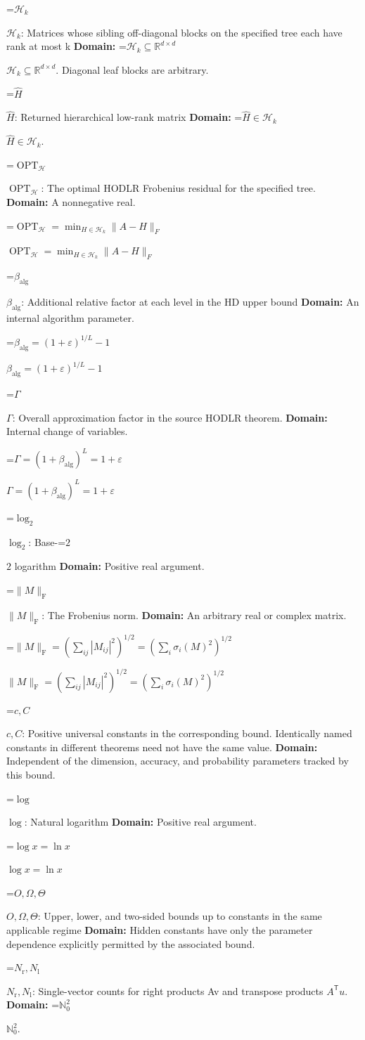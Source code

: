 \documentclass[10pt,a4paper]{article}
\newcommand{\AtlasMath}[1]{\par\begingroup\centering\setbox0=\hbox{$\displaystyle #1$}\ifdim\wd0>1.4\linewidth\typeout{ATLAS WIDE FORMULA: \the\wd0}\fi\ifdim\wd0>\linewidth\resizebox{\linewidth}{!}{\box0}\else\box0\fi\par\endgroup}
\newcommand{\AtlasInlineMath}[1]{\begingroup\setbox0=\hbox{$#1$}\ifdim\wd0>.4\linewidth\endgroup\AtlasMath{#1}\else\endgroup$#1$\fi}
\begin{document}
\AtlasInlineMath{\mathcal H_k}: Matrices whose sibling off-diagonal blocks on the specified tree each have rank at most k \textbf{Domain:} \AtlasInlineMath{\mathcal H_k\subseteq\mathbb R^{d\times d}}. Diagonal leaf blocks are arbitrary.

\AtlasInlineMath{\widehat H}: Returned hierarchical low-rank matrix \textbf{Domain:} \AtlasInlineMath{\widehat H\in\mathcal H_k}.

\AtlasInlineMath{\operatorname{OPT}_{\mathcal H}}: The optimal HODLR Frobenius residual for the specified tree. \textbf{Domain:} A nonnegative real.

\AtlasInlineMath{\operatorname{OPT}_{\mathcal H}=\min_{H\in\mathcal H_k}\|A-H\|_F}

\AtlasInlineMath{\beta_{\mathrm{alg}}}: Additional relative factor at each level in the HD upper bound \textbf{Domain:} An internal algorithm parameter.

\AtlasInlineMath{\beta_{\mathrm{alg}}=(1+\varepsilon)^{1/L}-1}

\AtlasInlineMath{\Gamma}: Overall approximation factor in the source HODLR theorem. \textbf{Domain:} Internal change of variables.

\AtlasInlineMath{\Gamma=(1+\beta_{\mathrm{alg}})^L=1+\varepsilon}

\AtlasInlineMath{\log_2}: Base-\AtlasInlineMath{2} logarithm \textbf{Domain:} Positive real argument.

\AtlasInlineMath{\|M\|_{\mathrm F}}: The Frobenius norm. \textbf{Domain:} An arbitrary real or complex matrix.

\AtlasInlineMath{\|M\|_{\mathrm F}=(\sum_{ij}|M_{ij}|^2)^{1/2}=(\sum_i\sigma_i(M)^2)^{1/2}}

\AtlasInlineMath{c,C}: Positive universal constants in the corresponding bound. Identically named constants in different theorems need not have the same value. \textbf{Domain:} Independent of the dimension, accuracy, and probability parameters tracked by this bound.

\AtlasInlineMath{\log}: Natural logarithm \textbf{Domain:} Positive real argument.

\AtlasInlineMath{\log x=\ln x}

\AtlasInlineMath{O,\Omega,\Theta}: Upper, lower, and two-sided bounds up to constants in the same applicable regime \textbf{Domain:} Hidden constants have only the parameter dependence explicitly permitted by the associated bound.

\AtlasInlineMath{N_{\mathrm r},N_{\mathrm l}}: Single-vector counts for right products Av and transpose products $A^{\mathsf T}u$. \textbf{Domain:} \AtlasInlineMath{\mathbb N_0^2}.
\end{document}
